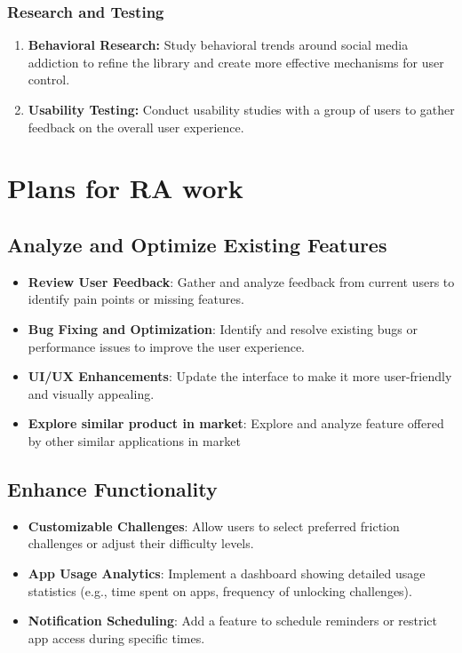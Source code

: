 \documentclass[12pt]{article}
\begin{document}
     \subsubsection{Research and Testing}
     \begin{enumerate}
         \item \textbf{Behavioral Research:} Study behavioral trends around social media addiction to refine the library and create more effective mechanisms for user control.
         \item \textbf{Usability Testing:} Conduct usability studies with a group of users to gather feedback on  the overall user experience.
     \end{enumerate}
    
    \section{Plans for  RA work}
    \subsection{Analyze and Optimize Existing Features}
    \begin{itemize}
        \item \textbf{Review User Feedback}: Gather and analyze feedback from current users to identify pain points or missing features.
        \item \textbf{Bug Fixing and Optimization}: Identify and resolve existing bugs or performance issues to improve the user experience.
        \item \textbf{UI/UX Enhancements}: Update the interface to make it more user-friendly and visually appealing.
       \item \textbf{Explore similar product in market}: Explore and analyze feature offered by other similar applications in market
    \end{itemize}
    
    \subsection{Enhance Functionality}
    \begin{itemize}
        \item \textbf{Customizable Challenges}: Allow users to select preferred friction challenges or adjust their difficulty levels.
        \item \textbf{App Usage Analytics}: Implement a dashboard showing detailed usage statistics (e.g., time spent on apps, frequency of unlocking challenges).
        \item \textbf{Notification Scheduling}: Add a feature to schedule reminders or restrict app access during specific times.
    \end{itemize}
    
\end{document}

